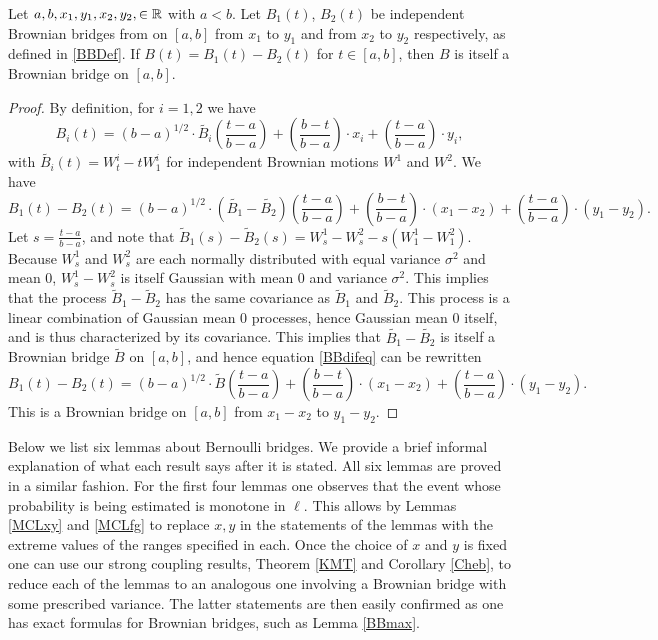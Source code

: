 \begin{lemma}\label{BBDif}
	Let $a,b,x_1,y_1,x_2,y_2,\in \mathbb{R}$ with $a<b$. Let $B_1(t)$, $B_2(t)$ be independent Brownian bridges from on $[a,b]$ from $x_1$ to $y_1$ and from $x_2$ to $y_2$ respectively, as defined in \ref{BBDef}. If $B(t)=B_1(t)-B_2(t)$ for $t\in[a,b]$, then $B$ is itself a Brownian bridge on $[a,b]$.
\end{lemma}
\begin{proof}
	By definition, for $i = 1,2$ we have
	\begin{equation*}
		B_i(t)=(b-a)^{1/2}\cdot \tilde{B_i}\left(\frac{t-a}{b-a}\right)+\left(\frac{b-t}{b-a}\right)\cdot x_i+\left(\frac{t-a}{b-a}\right)\cdot y_i,
	\end{equation*} 
	with $\tilde{B_i}(t)=W^i_t-tW^i_1$ for independent Brownian motions $W^1$ and $W^2$. We have
	\begin{equation}\label{BBdifeq}
		B_1(t)-B_2(t)=(b-a)^{1/2}\cdot(\tilde{B_1}-\tilde{B_2})\left(\frac{t-a}{b-a}\right)+\left(\frac{b-t}{b-a}\right)\cdot (x_1-x_2)+\left(\frac{t-a}{b-a}\right)\cdot (y_1-y_2).
	\end{equation}
	Let $s=\frac{t-a}{b-a}$, and note that  $\tilde B_1(s)-\tilde B_2(s)=W^1_{s}-W^2_{s}-s(W^1_1-W^2_1)$. Because $W^1_{s}$ and $W^2_{s}$ are each normally distributed with equal variance $\sigma^2$ and mean $0$, $W^1_{s}-W^2_{s}$ is itself Gaussian with mean 0 and variance $\sigma^2$. This implies that the process $\tilde{B}_1 - \tilde{B}_2$ has the same covariance as $\tilde{B}_1$ and $\tilde{B}_2$. This process is a linear combination of Gaussian mean 0 processes, hence Gaussian mean 0 itself, and is thus characterized by its covariance. This implies that $\tilde{B_1}-\tilde{B_2}$ is itself a Brownian bridge $\tilde B$ on $[a,b]$, and hence equation \ref{BBdifeq} can be rewritten  \begin{equation*}
		B_1(t)-B_2(t)=(b-a)^{1/2}\cdot\tilde{B}\left(\frac{t-a}{b-a}\right)+\left(\frac{b-t}{b-a}\right)\cdot (x_1-x_2)+\left(\frac{t-a}{b-a}\right)\cdot (y_1-y_2).
	\end{equation*}
	This is a Brownian bridge on $[a,b]$ from $x_1-x_2$ to $y_1-y_2$. 
\end{proof}

Below we list six lemmas about Bernoulli bridges. We provide a brief informal explanation of what each result says after it is stated. All six lemmas are proved in a similar fashion. For the first four lemmas one observes that the event whose probability is being estimated is monotone in $\ell$. This allows by Lemmas \ref{MCLxy} and \ref{MCLfg} to replace $x,y$ in the statements of the lemmas with the extreme values of the ranges specified in each. Once the choice of $x$ and $y$ is fixed one can use our strong coupling results, Theorem \ref{KMT} and Corollary \ref{Cheb}, to reduce each of the lemmas to an analogous one involving a Brownian bridge with some prescribed variance. The latter statements are then easily confirmed as one has exact formulas for Brownian bridges, such as Lemma \ref{BBmax}.\\


